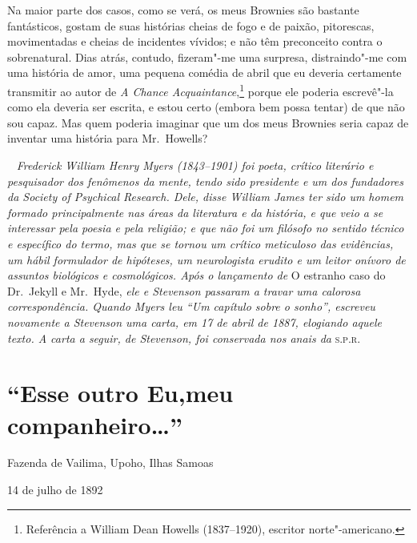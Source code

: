 Na maior parte dos casos, como se verá, os meus Brownies são bastante
fantásticos, gostam de suas histórias cheias de fogo e de paixão,
pitorescas, movimentadas e cheias de incidentes vívidos; e não têm
preconceito contra o sobrenatural.  Dias atrás, contudo, fizeram"-me uma
surpresa, distraindo"-me com uma história de amor, uma pequena comédia
de abril que eu deveria certamente transmitir ao autor de \textit{A
Chance Acquaintance},\footnote{ Referência a William Dean 
Howells (1837--1920), escritor norte"-americano.} porque ele poderia escrevê"-la como ela deveria
ser escrita, e estou certo (embora bem possa tentar) de que não sou
capaz.  Mas quem poderia imaginar que um dos meus Brownies seria capaz
de inventar uma história para Mr.~Howells?

\clearpage
\ifodd\thepage ~ \clearpage\else\relax\fi
\thispagestyle{empty}
\mbox{}\vfill
{\noindent\itshape Frederick William Henry Myers (1843--1901) foi poeta, crítico           \label{cartastev}
literário e pesquisador dos fenômenos da mente, tendo sido presidente e
um dos fundadores da Society of Psychical Research.  Dele, disse
William James ter sido um homem formado principalmente nas áreas da
literatura e da história, e que veio a se interessar pela poesia e pela
religião; e que não foi um filósofo no sentido técnico e específico do
termo, mas que se tornou um crítico meticuloso das evidências, um hábil
formulador de hipóteses, um neurologista erudito e um leitor onívoro de
assuntos biológicos e cosmológicos.  Após o lançamento de}
O estranho caso do Dr.~Jekyll e Mr.~Hyde, \textit{ele e Stevenson passaram a travar
uma calorosa correspondência.  Quando Myers leu ``Um capítulo
sobre o sonho'', escreveu novamente a Stevenson uma carta, em 17
de abril de 1887, elogiando aquele texto.  A carta a seguir, de
Stevenson, foi conservada nos anais da} \textsc{s.p.r.}

\chapter[Esse outro Eu, meu companheiro\ldots{}\\ \textit{R.L.~Stevenson}]{“Esse outro Eu,\break meu companheiro\ldots{}”}

\vspace*{.8em}

Fazenda de Vailima, Upoho, Ilhas Samoas

14 de julho de 1892 


